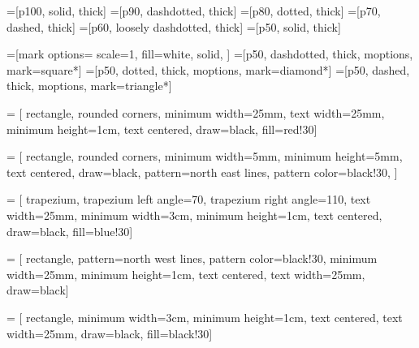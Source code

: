 \tikzset{external/force remake}
  \tikzexternalize[prefix=External/]

\tikzset{>=latex}


=[p100, solid, thick]
=[p90, dashdotted, thick]
=[p80, dotted, thick]
=[p70, dashed, thick]
=[p60, loosely dashdotted, thick]
=[p50, solid, thick]

=[mark options={
  scale=1,
  fill=white,
  solid,
  }]
=[p50, dashdotted, thick, moptions, mark=square*]
=[p50, dotted, thick, moptions, mark=diamond*]
=[p50, dashed, thick, moptions, mark=triangle*]

 = [
  rectangle,
  rounded corners,
  minimum width=25mm,
  text width=25mm,
  minimum height=1cm,
  text centered,
  draw=black,
  fill=red!30]

 = [
  rectangle,
  rounded corners,
  minimum width=5mm,
  minimum height=5mm,
  text centered,
  draw=black,
  pattern=north east lines,
  pattern color=black!30,
  ]

 = [
  trapezium,
  trapezium left angle=70,
  trapezium right angle=110,
  text width=25mm,
  minimum width=3cm,
  minimum height=1cm,
  text centered,
  draw=black,
  fill=blue!30]

 = [
  rectangle,
  pattern=north west lines,
  pattern color=black!30,
  minimum width=25mm,
  minimum height=1cm,
  text centered,
  text width=25mm,
  draw=black]

 = [
  rectangle,
  minimum width=3cm,
  minimum height=1cm,
  text centered,
  text width=25mm,
  draw=black,
  fill=black!30]





